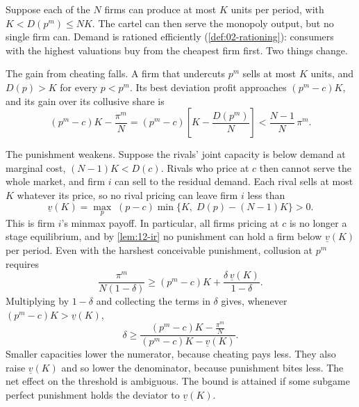 \begin{example}\label{ex:12-capacity}
Suppose each of the $N$ firms can produce at most $K$ units per period, with $K < D(p^m) \le NK$. The cartel can then
serve the monopoly output, but no single firm can. Demand is rationed efficiently (\cref{def:02-rationing}):
consumers with the highest valuations buy from the cheapest firm first. Two things change.

The gain from cheating falls. A firm that undercuts $p^m$ sells at most $K$ units, and $D(p) > K$ for every
$p < p^m$. Its best deviation profit approaches $(p^m - c)K$, and its gain over its collusive share is
\begin{equation*}
(p^m - c)K - \frac{\pi^m}{N} = (p^m - c)\left[K - \frac{D(p^m)}{N}\right] < \frac{N - 1}{N}\,\pi^m .
\end{equation*}

The punishment weakens. Suppose the rivals' joint capacity is below demand at marginal cost, $(N - 1)K < D(c)$.
Rivals who price at $c$ then cannot serve the whole market, and firm $i$ can sell to the residual demand. Each rival
sells at most $K$ whatever its price, so no rival pricing can leave firm $i$ less than
\begin{equation}\label{eq:12-capacity-minmax}
\underline v(K) = \max_{p}\;(p - c)\min\bigl\{K,\; D(p) - (N - 1)K\bigr\} > 0 .
\end{equation}
This is firm $i$'s minmax payoff. In particular, all firms pricing at $c$ is no longer a stage equilibrium, and by
\cref{lem:12-ir} no punishment can hold a firm below $\underline v(K)$ per period. Even with the harshest conceivable
punishment, collusion at $p^m$ requires
\begin{equation*}
\frac{\pi^m}{N(1 - \delta)} \ge (p^m - c)K + \frac{\delta\,\underline v(K)}{1 - \delta} .
\end{equation*}
Multiplying by $1 - \delta$ and collecting the terms in $\delta$ gives, whenever $(p^m - c)K > \underline v(K)$,
\begin{equation*}
\delta \ge \frac{(p^m - c)K - \frac{\pi^m}{N}}{(p^m - c)K - \underline v(K)} .
\end{equation*}
Smaller capacities lower the numerator, because cheating pays less. They also raise $\underline v(K)$ and so lower the
denominator, because punishment bites less. The net effect on the threshold is ambiguous. The bound is attained if
some subgame perfect punishment holds the deviator to $\underline v(K)$.
\end{example}

